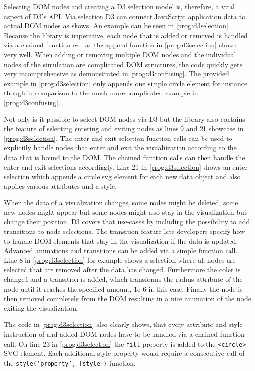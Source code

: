 Selecting DOM nodes and creating a D3 selection model is, therefore, a vital aspect of D3's API. Via selection D3 can connect JavaScript application data to actual DOM nodes as \cite[/d3-selection]{D3Github} shows. An example can be seen in \ref{prog:d3selection}. Because the library is imperative, each node that is added or removed is handled via a chained function call as the append function in \ref{prog:d3selection} shows very well. When adding or removing multiple DOM nodes and the individual nodes of the simulation are complicated DOM structures, the code quickly gets very incomprehensive as demonstrated in \ref{prog:d3confusing}. The provided example in \ref{prog:d3selection} only appends one simple circle element for instance though in comparison to the much more complicated example in \ref{prog:d3confusing}. 

Not only is it possible to select DOM nodes via D3 but the library also contains the feature of selecting entering and exiting nodes as lines 9 and 21 showcase in \ref{prog:d3selection}. The enter and exit selection function calls can be used to explicitly handle nodes that enter and exit the visualiization according to the data that is bound to the DOM. The chained function calls can then handle the enter and exit selections accordingly. Line 21 in \ref{prog:d3selection} shows an enter selection which appends a circle svg element for each new data object and also applies various attributes and a style.

When the data of a visualization changes, some nodes might be deleted, some new nodes might appear but some nodes might also stay in the visualization but change their position. D3 covers that use-cases by including the possibility to add transitions to node selections. The transition feature lets developers specify how to handle DOM elements that stay in the visualization if the data is updated. Advanced animations and transitions can be added via a simple function call. Line 8 in \ref{prog:d3selection} for example shows a selection where all nodes are selected that are removed after the data has changed. Furthermore the color is changed and a transition is added, which transforms the radius attribute of the node until it reaches the specified amount, 1e-6 in this case. Finally the node is then removed completely from the DOM resulting in a nice animation of the node exiting the visualization.

The code in \ref{prog:d3selection} also clearly shows, that every attribute and style instruction of and added DOM nodes have to be handled via a chained function call. On line 23 in \ref{prog:d3selection} the \texttt{fill} property is added to the \texttt{<circle>} SVG element. Each additional style property would require a consecutive call of the \texttt{style('property', [style])} function.

